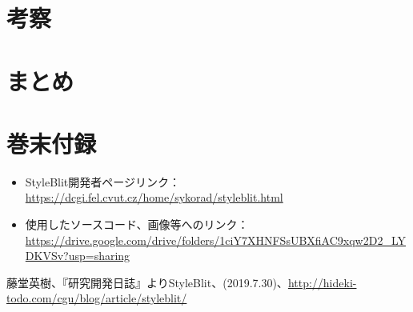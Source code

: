 \documentclass[dvipdfmx]{jsarticle}
\begin{document}
\section{考察}
\section{まとめ}


\section{巻末付録}
\begin{itemize}
  \item StyleBlit開発者ページリンク：\url{https://dcgi.fel.cvut.cz/home/sykorad/styleblit.html}
  \item 使用したソースコード、画像等へのリンク：\url{https://drive.google.com/drive/folders/1ciY7XHNFSsUBXfiAC9xqw2D2_LYDKVSv?usp=sharing}
\end{itemize}
\begin{thebibliography}{99}
   藤堂英樹、『研究開発日誌』よりStyleBlit、(2019.7.30)、\url{http://hideki-todo.com/cgu/blog/article/styleblit/}
\end{thebibliography}
\end{document}
